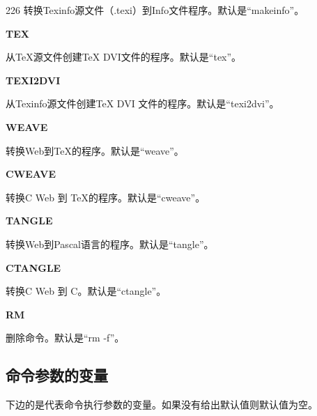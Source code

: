 \begin{dinglist}{226}
转换Texinfo源文件（.texi）到Info文件程序。默认是“makeinfo”。

\item \textbf{TEX}

从TeX源文件创建TeX DVI文件的程序。默认是“tex”。

\item \textbf{TEXI2DVI}

从Texinfo源文件创建TeX DVI 文件的程序。默认是“texi2dvi”。

\item \textbf{WEAVE}

转换Web到TeX的程序。默认是“weave”。

\item \textbf{CWEAVE}

转换C Web 到 TeX的程序。默认是“cweave”。

\item \textbf{TANGLE}

转换Web到Pascal语言的程序。默认是“tangle”。

\item \textbf{CTANGLE}

转换C Web 到 C。默认是“ctangle”。

\item \textbf{RM}

删除命令。默认是“rm -f”。


\end{dinglist}


\subsection{命令参数的变量}
下边的是代表命令执行参数的变量。如果没有给出默认值则默认值为空。


